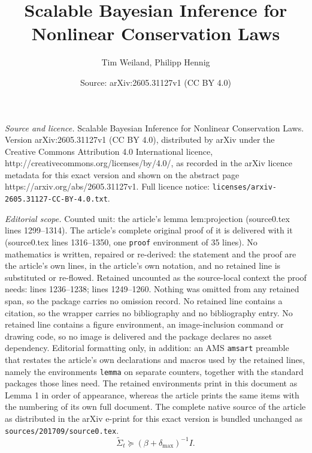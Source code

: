 \documentclass[10pt,a4paper]{amsart}
\title{Scalable Bayesian Inference for Nonlinear Conservation Laws}
\author{Tim Weiland, Philipp Hennig}
\date{Source: arXiv:2605.31127v1 (CC BY 4.0)}
\begin{document}
\maketitle

\noindent\emph{Source and licence.} Scalable Bayesian Inference for Nonlinear Conservation Laws. Version arXiv:2605.31127v1 (CC BY 4.0), distributed by arXiv under the Creative Commons Attribution 4.0 International licence, http://creativecommons.org/licenses/by/4.0/, as recorded in the arXiv licence metadata for this exact version and shown on the abstract page https://arxiv.org/abs/2605.31127v1. Full licence notice: \texttt{licenses/arxiv-2605.31127-CC-BY-4.0.txt}.\par\smallskip

\noindent\textit{Editorial scope.} Counted unit: the article's lemma lem:projection (source0.tex lines 1299--1314). The article's complete original proof of it is delivered with it (source0.tex lines 1316--1350, one \texttt{proof} environment of 35 lines). No mathematics is written, repaired or re-derived: the statement and the proof are the article's own lines, in the article's own notation, and no retained line is substituted or re-flowed.  Retained uncounted as the source-local context the proof needs: lines 1236--1238; lines 1249--1260.  Nothing was omitted from any retained span, so the package carries no omission record.  No retained line contains a citation, so the wrapper carries no bibliography and no bibliography entry.  No retained line contains a figure environment, an image-inclusion command or drawing code, so no image is delivered and the package declares no asset dependency.  Editorial formatting only, in addition: an AMS \texttt{amsart} preamble that restates the article's own declarations and macros used by the retained lines, namely the environments \texttt{lemma} on separate counters, together with the standard packages those lines need.  The retained environments print in this document as Lemma 1 in order of appearance, whereas the article prints the same items with the numbering of its own full document.  The complete native source of the article as distributed in the arXiv e-print for this exact version is bundled unchanged as \texttt{sources/201709/source0.tex}.
\begin{equation}\label{eq:cov_lower}
\widetilde{\Sigma}_t \succeq (\beta + \delta_{\max})^{-1} I.
\end{equation}
\end{document}
